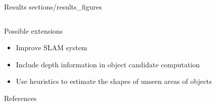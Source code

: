 \documentclass[final]{beamer}
\newlength{\onecolwid}
\newlength{\twocolwid}
\begin{document}
\begin{frame}[t]
\begin{columns}[t]
\begin{column}{\twocolwid}
\begin{block}{Results}
{sections/results_figures}

\end{block}

\begin{columns}[t,totalwidth=\twocolwid]

	\begin{column}{\onecolwid}






		\begin{block}{Possible extensions}
			
		\begin{itemize}
			\item Improve SLAM system
			\item Include depth information in object candidate computation
			\item Use heuristics to estimate the shapes of unseen areas of objects
		\end{itemize}

		\end{block}


		\begin{block}{References}

		\small{
		\vspace{0.75in}}


\end{block}
\end{column}
\end{columns}
\end{column}
\end{columns}
\end{frame}
\end{document}
